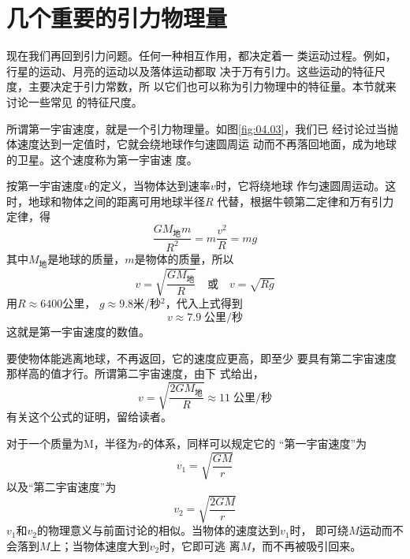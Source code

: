 \section{几个重要的引力物理量}\label{sec:04.05}

现在我们再回到引力问题。任何一种相互作用，都决定着一
类运动过程。例如，行星的运动、月亮的运动以及落体运动都取
决于万有引力。这些运动的特征尺度，主要决定于引力常数，所
以它们也可以称为引力物理中的特征量。本节就来讨论一些常见
的特征尺度。

所谓第一宇宙速度，就是一个引力物理量。如图\ref{fig:04.03}，我们已
经讨论过当抛体速度达到一定值时，它就会绕地球作匀速圆周运
动而不再落回地面，成为地球的卫星。这个速度称为第一宇宙速
度。

按第一宇宙速度$ v $的定义，当物体达到速率$ v $时，它将绕地球
作匀速圆周运动。这时，地球和物体之间的距离可用地球半径$ R $
代替，根据牛顿第二定律和万有引力定律，得
\begin{equation*}
  \frac { G M _ \text{地} m } { R ^ { 2 } } = m \frac { v ^ { 2 } } { R } = m g
\end{equation*}
其中$ M _ \text{地} $是地球的质量，$ m $是物体的质量，所以
\begin{equation}\label{eqn:04.05.01}
  v = \sqrt { \frac { G M _ { \text{地} } } { R }}
  \quad \text{或} \quad v = \sqrt { R g }
\end{equation}
用$ R\approx 6400 $公里， $ g \approx 9.8 $米/秒$ ^2 $，代入上式得到
\begin{equation*}
  v \approx 7.9 \;\text{公里/秒}
\end{equation*}
这就是第一宇宙速度的数值。

要使物体能逃离地球，不再返回，它的速度应更高，即至少
要具有第二宇宙速度那样高的值才行。所谓第二宇宙速度，由下
式给出，
\begin{equation*}
  v = \sqrt{\frac { 2 G M _ { \text{地} } } { R }} \approx 11 \;\text{公里/秒}
\end{equation*}
有关这个公式的证明，留给读者。

对于一个质量为M，半径为$ r $的体系，同样可以规定它的
“第一宇宙速度”为
\begin{equation}\label{eqn:04.05.02}
  v _ { 1 } = \sqrt {\frac { G M } { r }}
\end{equation}
以及“第二宇宙速度”为
\begin{equation}\label{eqn:04.05.03}
  v _ { 2 } = \sqrt {\frac { 2 G M } { r }}
\end{equation}
$ v_1 $和$ v _ 2 $的物理意义与前面讨论的相似。当物体的速度达到$ v_1 $时，
即可绕$ M $运动而不会落到$ M $上；当物体速度大到$ v_2 $时，它即可逃
离$ M $，而不再被吸引回来。

